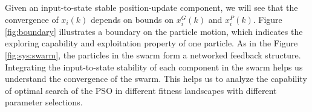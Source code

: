 \documentclass[phd]{byuprop}
\begin{document}
Given an input-to-state stable position-update component, we will see that the convergence of $ x_{i}(k) $ depends on bounds on $ x^{G}_{i}(k) $ and $ x^{P}_{i}(k) $.
Figure \ref{fig:boundary} illustrates a boundary on the particle motion, which indicates the exploring capability and exploitation property of one particle.
As in the Figure \ref{fig:sys:swarm}, the particles in the swarm form a networked feedback structure.
Integrating the input-to-state stability of each component in the swarm helps us understand the convergence of the swarm.
This helps us to analyze the capability of optimal search of the PSO in different fitness landscapes with different parameter selections.




\end{document}
